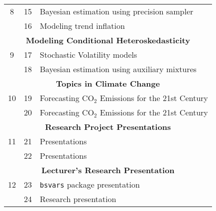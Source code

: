 \documentclass[10pt]{article}
\begin{document}
\begin{multicols}{2}
\begin{center}
\begin{tabular}{c c l}
8 & 15  & Bayesian estimation using precision sampler \\
   & 16  & Modeling trend inflation \\[1ex]
\multicolumn{3}{c}{\textbf{Modeling Conditional Heteroskedasticity}}\\
9 & 17  & Stochastic Volatility models \\
   & 18  & Bayesian estimation using auxiliary mixtures \\[1ex]
\multicolumn{3}{c}{\textbf{Topics in Climate Change}}\\
10 & 19  & Forecasting CO$_2$ Emissions for the 21st Century \\
    & 20  & Forecasting CO$_2$ Emissions for the 21st Century \\[1ex]
\multicolumn{3}{c}{\textbf{Research Project Presentations}}\\
11 & 21 & Presentations \\
    & 22 & Presentations \\ [1ex]
\multicolumn{3}{c}{\textbf{Lecturer's Research Presentation}}\\
12 & 23  & \texttt{bsvars} package presentation\\
   & 24  & Research presentation\\[1ex]
\bottomrule
\end{tabular}
\end{center}

\end{multicols}











\newpage
\end{document}
